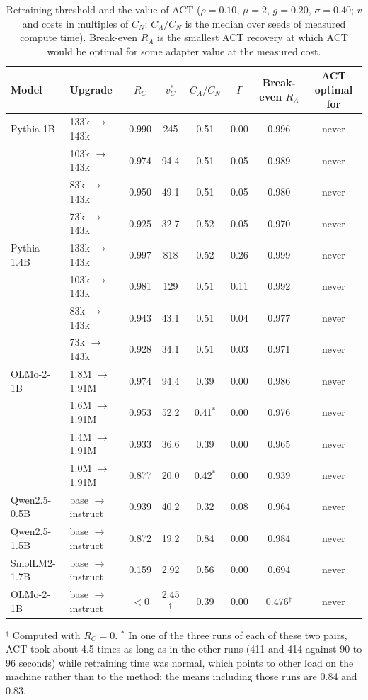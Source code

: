 \documentclass[ijds,blindrev]{informs4}
\begin{document}
\begin{table}[t]
\centering
\caption{Retraining threshold and the value of ACT ($\rho=0.10$, $\mu=2$, $g=0.20$, $\sigma=0.40$; $v$ and costs in multiples of $C_N$; $C_A/C_N$ is the median over seeds of measured compute time). Break-even $R_A$ is the smallest ACT recovery at which ACT would be optimal for some adapter value at the measured cost.}\label{tab:policy}
\small
\begin{tabular}{llcccccc}
\toprule
Model & Upgrade & $R_C$ & $v^*_C$ & $C_A/C_N$ & $\Gamma$ & Break-even $R_A$ & ACT optimal for\\
\midrule
Pythia-1B & 133k $\to$ 143k & 0.990 & 245 & 0.51 & 0.00 & 0.996 & never\\
 & 103k $\to$ 143k & 0.974 & 94.4 & 0.51 & 0.05 & 0.989 & never\\
 & 83k $\to$ 143k & 0.950 & 49.1 & 0.51 & 0.05 & 0.980 & never\\
 & 73k $\to$ 143k & 0.925 & 32.7 & 0.52 & 0.05 & 0.970 & never\\
Pythia-1.4B & 133k $\to$ 143k & 0.997 & 818 & 0.52 & 0.26 & 0.999 & never\\
 & 103k $\to$ 143k & 0.981 & 129 & 0.51 & 0.11 & 0.992 & never\\
 & 83k $\to$ 143k & 0.943 & 43.1 & 0.51 & 0.04 & 0.977 & never\\
 & 73k $\to$ 143k & 0.928 & 34.1 & 0.51 & 0.03 & 0.971 & never\\
OLMo-2-1B & 1.8M $\to$ 1.91M & 0.974 & 94.4 & 0.39 & 0.00 & 0.986 & never\\
 & 1.6M $\to$ 1.91M & 0.953 & 52.2 & 0.41$^\ast$ & 0.00 & 0.976 & never\\
 & 1.4M $\to$ 1.91M & 0.933 & 36.6 & 0.39 & 0.00 & 0.965 & never\\
 & 1.0M $\to$ 1.91M & 0.877 & 20.0 & 0.42$^\ast$ & 0.00 & 0.939 & never\\
Qwen2.5-0.5B & base $\to$ instruct & 0.939 & 40.2 & 0.32 & 0.08 & 0.964 & never\\
Qwen2.5-1.5B & base $\to$ instruct & 0.872 & 19.2 & 0.84 & 0.00 & 0.984 & never\\
SmolLM2-1.7B & base $\to$ instruct & 0.159 & 2.92 & 0.56 & 0.00 & 0.694 & never\\
OLMo-2-1B & base $\to$ instruct & $<0$ & 2.45$^\dagger$ & 0.39 & 0.00 & 0.476$^\dagger$ & never\\
\bottomrule
\end{tabular}

\smallskip\footnotesize $^\dagger$ Computed with $R_C=0$. $^\ast$ In one of the three runs of each of these two pairs, ACT took about 4.5 times as long as in the other runs (411 and 414 against 90 to 96 seconds) while retraining time was normal, which points to other load on the machine rather than to the method; the means including those runs are 0.84 and 0.83.
\end{table}
\end{document}
